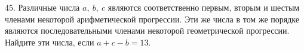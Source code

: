 45. Различные числа $a,\ b,\ c$ являются соответственно первым, вторым и шестым членами некоторой арифметической прогрессии. Эти же числа в том же порядке являются последовательными членами некоторой геометрической прогрессии. Найдите эти числа, если $a+c-b=13.$\\
